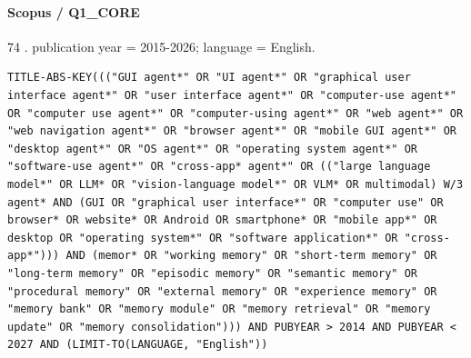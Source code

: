 \noindent\begin{minipage}{\linewidth}
\paragraph{Scopus / Q1\_CORE}
74 .
publication year = 2015-2026; language = English.
\begin{lstlisting}
TITLE-ABS-KEY((("GUI agent*" OR "UI agent*" OR "graphical user interface agent*" OR "user interface agent*" OR "computer-use agent*" OR "computer use agent*" OR "computer-using agent*" OR "web agent*" OR "web navigation agent*" OR "browser agent*" OR "mobile GUI agent*" OR "desktop agent*" OR "OS agent*" OR "operating system agent*" OR "software-use agent*" OR "cross-app* agent*" OR (("large language model*" OR LLM* OR "vision-language model*" OR VLM* OR multimodal) W/3 agent* AND (GUI OR "graphical user interface*" OR "computer use" OR browser* OR website* OR Android OR smartphone* OR "mobile app*" OR desktop OR "operating system*" OR "software application*" OR "cross-app*"))) AND (memor* OR "working memory" OR "short-term memory" OR "long-term memory" OR "episodic memory" OR "semantic memory" OR "procedural memory" OR "external memory" OR "experience memory" OR "memory bank" OR "memory module" OR "memory retrieval" OR "memory update" OR "memory consolidation"))) AND PUBYEAR > 2014 AND PUBYEAR < 2027 AND (LIMIT-TO(LANGUAGE, "English"))
\end{lstlisting}
\end{minipage}\par\medskip
